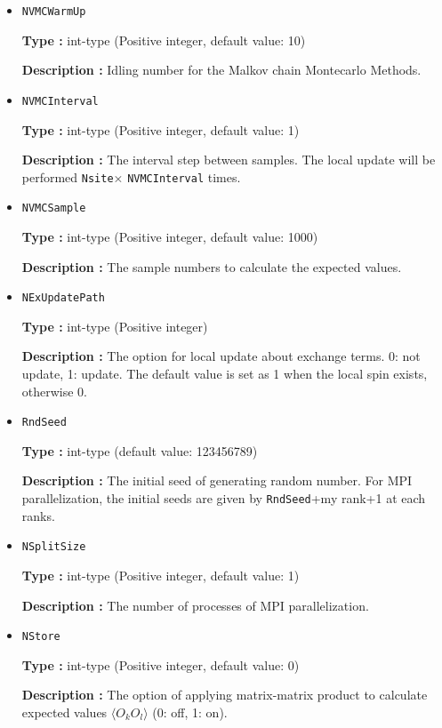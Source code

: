 \begin{itemize}
{\bf Description :} The time step using in the SR method. 
 
\item \verb|NVMCWarmUp|

{\bf Type :} int-type (Positive integer, default value: 10)

{\bf Description :} Idling number for the Malkov chain Montecarlo Methods.

\item \verb|NVMCInterval|

{\bf Type :} int-type (Positive integer, default value: 1)

{\bf Description :} The interval step between samples. The local update will be performed \verb|Nsite|× \verb|NVMCInterval| times.

\item \verb|NVMCSample|

{\bf Type :} int-type (Positive integer, default value: 1000)

{\bf Description :} The sample numbers to calculate the expected values.

\item \verb|NExUpdatePath|

{\bf Type :} int-type (Positive integer)

{\bf Description :}  The option for local update about exchange terms. 0: not update, 1: update. The default value is set as 1 when the local spin exists, otherwise 0.

\item \verb|RndSeed|

{\bf Type :} int-type (default value: 123456789)

{\bf Description :} The initial seed of generating random number. For MPI parallelization, the initial seeds are given by \verb|RndSeed|+my rank+1 at each ranks. 

 \item \verb|NSplitSize|

{\bf Type :} int-type (Positive integer, default value: 1)

{\bf Description :} The number of processes of MPI parallelization.

\item \verb|NStore|

{\bf Type :} int-type (Positive integer, default value: 0)

{\bf Description :} The option of applying matrix-matrix product to calculate expected values $\langle O_k O_l \rangle$ (0: off, 1: on).  
  

\end{itemize}
